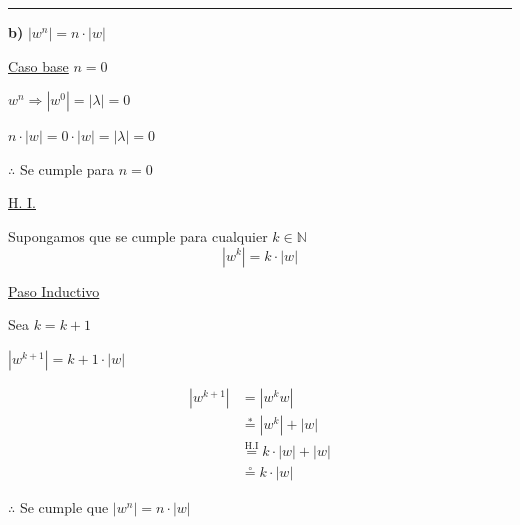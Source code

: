 \vspace{0.4cm}
\hrule
\vspace{0.4cm}


\textbf{b)} $|w^n| = n \cdot |w|$

\underline{Caso base} $n=0$

$w^n \Rightarrow |w^0| = |\lambda| = 0$

$n \cdot |w| = 0 \cdot |w| = |\lambda| = 0$

$\therefore$ Se cumple para $n=0$

\vspace{0.8em}
\underline{H. I.}

Supongamos que se cumple para cualquier $k \in \mathbb{N}$
\[
|w^k| = k \cdot |w|
\]

\underline{Paso Inductivo}

Sea $k = k+1$

$|w^{k+1}| = k+1 \cdot |w|$

\begin{align*}
|w^{k+1}| &= |w^k w| \\
&\overset{*}{=} |w^k| + |w| \\
&\overset{\text{H.I}}{=} k \cdot |w| + |w| \\
&\overset{\circ}{=} k \cdot |w|
\end{align*}

$\therefore$ Se cumple que $|w^n| = n \cdot |w|$
